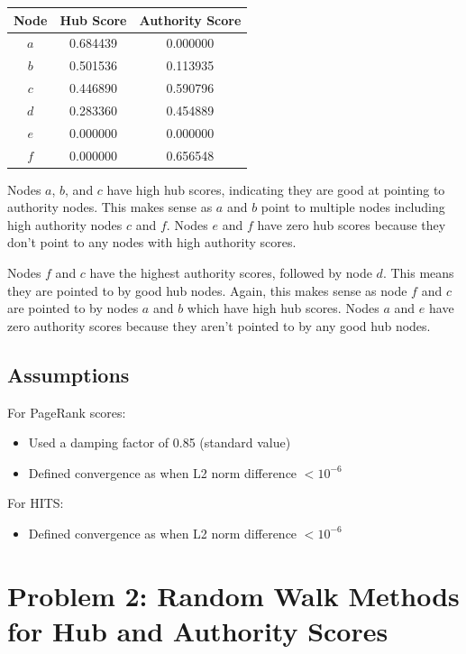 \documentclass{article}
\begin{document}
\begin{center}
\begin{tabular}{|c|c|c|}
\hline
\textbf{Node} & \textbf{Hub Score} & \textbf{Authority Score} \\
\hline
$a$ & 0.684439 & 0.000000 \\
$b$ & 0.501536 & 0.113935 \\
$c$ & 0.446890 & 0.590796 \\
$d$ & 0.283360 & 0.454889 \\
$e$ & 0.000000 & 0.000000 \\
$f$ & 0.000000 & 0.656548 \\
\hline
\end{tabular}
\end{center}

Nodes $a$, $b$, and $c$ have high hub scores, indicating they are good at pointing to authority nodes. This makes sense as $a$ and $b$ point to multiple nodes including high authority nodes $c$ and $f$. Nodes $e$ and $f$ have zero hub scores because they don't point to any nodes with high authority scores.

Nodes $f$ and $c$ have the highest authority scores, followed by node $d$. This means they are pointed to by good hub nodes. Again, this makes sense as node $f$ and $c$ are pointed to by nodes $a$ and $b$ which have high hub scores. Nodes $a$ and $e$ have zero authority scores because they aren't pointed to by any good hub nodes.

\subsection{Assumptions}
For PageRank scores:
\begin{itemize}
    \item Used a damping factor of 0.85 (standard value)
    \item Defined convergence as when L2 norm difference $< 10^{-6}$
\end{itemize}

For HITS:
\begin{itemize}
    \item Defined convergence as when L2 norm difference $< 10^{-6}$
\end{itemize}

\section{Problem 2: Random Walk Methods for Hub and Authority Scores}
\end{document}
